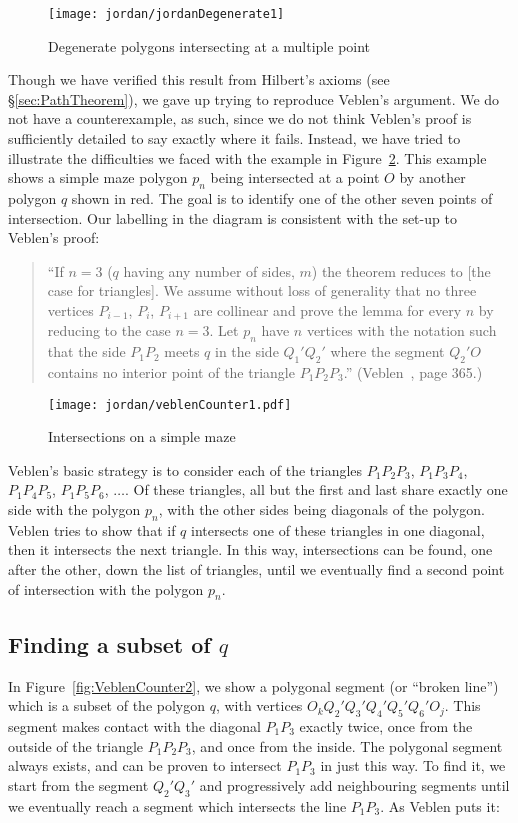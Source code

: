 \begin{figure}
\centering
\texttt{[image: jordan/jordanDegenerate1]}
\caption{Degenerate polygons intersecting at a multiple point}
\label{fig:jordanDegenerate1}
\end{figure}

Though we have verified this result from Hilbert's axioms (see \S\ref{sec:PathTheorem}), we gave up trying to reproduce Veblen's argument. We do not have a counterexample, as such, since we do not think Veblen's proof is sufficiently detailed to say exactly where it fails. Instead, we have tried to illustrate the difficulties we faced with the example in Figure~\ref{fig:VeblenCounter1}. This example shows a simple maze polygon $p_n$ being intersected at a point $O$ by another polygon $q$ shown in red. The goal is to identify one of the other seven points of intersection. Our labelling in the diagram is consistent with the set-up to Veblen's proof:

\begin{quote}
``If $n=3$ ($q$ having any number of sides, $m$) the theorem reduces to [the case for triangles]. We assume without loss of generality that no three vertices $P_{i-1}$, $P_i$, $P_{i+1}$ are collinear and prove the lemma for every $n$ by reducing to the case $n=3$. Let $p_n$ have $n$ vertices with the notation such that the side $P_1P_2$ meets $q$ in the side $Q_1'Q_2'$ where the segment $Q_2'O$ contains no interior point of the triangle $P_1P_2P_3$.'' (Veblen~\cite{Veblenphd}, page 365.)
\end{quote}

\begin{figure}
\centering
\texttt{[image: jordan/veblenCounter1.pdf]}
\caption{Intersections on a simple maze}
\label{fig:VeblenCounter1}
\end{figure}

Veblen's basic strategy is to consider each of the triangles $P_1P_2P_3$, $P_1P_3P_4$, $P_1P_4P_5$, $P_1P_5P_6$, $\ldots$. Of these triangles, all but the first and last share exactly one side with the polygon $p_n$, with the other sides being diagonals of the polygon. Veblen tries to show that if $q$ intersects one of these triangles in one diagonal, then it intersects the next triangle. In this way, intersections can be found, one after the other, down the list of triangles, until we eventually find a second point of intersection with the polygon $p_n$.

\subsection{Finding a subset of $q$}\label{sec:SubsetOfQ}
In Figure~\ref{fig:VeblenCounter2}, we show a polygonal segment  (or ``broken line'') which is a subset of the polygon $q$, with vertices $O_kQ_2'Q_3'Q_4'Q_5'Q_6'O_j$. This segment makes contact with the diagonal $P_1P_3$ exactly twice, once from the outside of the triangle $P_1P_2P_3$, and once from the inside. The polygonal segment always exists, and can be proven to intersect $P_1P_3$ in just this way. To find it, we start from the segment $Q_2'Q_3'$ and progressively add neighbouring segments until we eventually reach a segment which intersects the line $P_1P_3$. As Veblen puts it:

